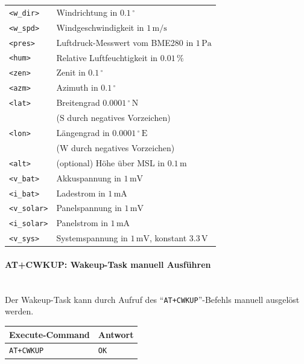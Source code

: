 \begin{table}[H]
\begin{tabular}{|p{}|p{}|}
                \texttt{<w\_dir>}   & Windrichtung in $0.1\,^\circ$\\
                \texttt{<w\_spd>}   & Windgeschwindigkeit in $1\,\mathrm{m/s}$\\
                \texttt{<pres>}      & Luftdruck-Messwert vom BME280 in $1\,\mathrm{Pa}$\\
                \texttt{<hum>}      & Relative Luftfeuchtigkeit in $0.01\,\%$\\
                \texttt{<zen>}      & Zenit in $0.1\,^\circ$\\
                \texttt{<azm>}      & Azimuth in $0.1\,^\circ$\\
                \texttt{<lat>}      & Breitengrad $0.0001\,^\circ\,\mathrm{N}$\\
                & ($\mathrm{S}$ durch negatives Vorzeichen)\\
                \texttt{<lon>}      & Längengrad in $0.0001\,^\circ\,\mathrm{E}$\\
                & ($\mathrm{W}$ durch negatives Vorzeichen)\\
                \texttt{<alt>}      & (optional) Höhe über MSL in $0.1\,\mathrm{m}$\\
                \texttt{<v\_bat>}   & Akkuspannung in $1\,\mathrm{mV}$\\
                \texttt{<i\_bat>}   & Ladestrom in $1\,\mathrm{mA}$\\
                \texttt{<v\_solar>} & Panelspannung in $1\,\mathrm{mV}$\\
                \texttt{<i\_solar>} & Panelstrom in $1\,\mathrm{mA}$\\
                \texttt{<v\_sys>}   & Systemspannung in $1\,\mathrm{mV}$, konstant $3.3\,\mathrm{V}$\\
                \hline
            \end{tabular}
            \label{tab:at_cgui}
        \end{table}
    
        \paragraph{AT+CWKUP: Wakeup-Task manuell Ausführen}\mbox{}\\
        Der Wakeup-Task kann durch Aufruf des ``\texttt{AT+CWKUP}''-Befehls manuell ausgelöst werden.
        
        \begin{table}[H]
            \centering
            \begin{tabular}{|p{}|p{}|}
                \hline
                \textbf{Execute-Command} &\textbf{Antwort} \\
                \hline
                \texttt{AT+CWKUP}  & \texttt{OK}\\
                \hline
            \end{tabular}
        \end{table}
    

